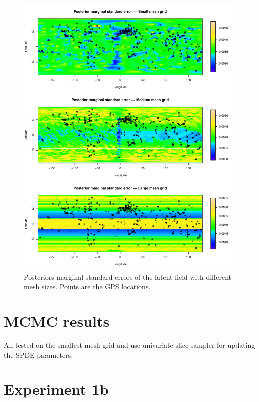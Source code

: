 \documentclass[a4paper,12pt]{article}
\begin{document}
 \begin{figure}[htbp]
 \begin{center}
 \includegraphics[scale=0.8]{fig/MeshSize_1GIAfield.pdf}
 \end{center}
 \caption[Posterior marginals of the latent field from different mesh size]{Posteriors marginal standard errors of the latent field with different mesh sizes. Points are the GPS locations.}
 \label{fig:4}
 \end{figure}
 

\section{MCMC results}

All tested on the smallest mesh grid and use univariate slice sampler for updating the SPDE parameters.





\section{Experiment 1b}
\end{document}
